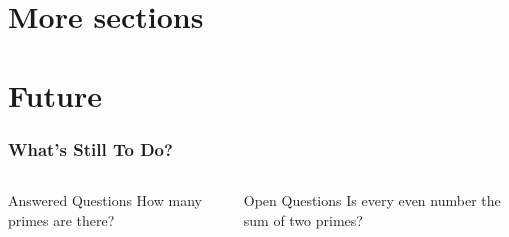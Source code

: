 \section{More sections}
\section{Future}
\begin{frame}
  \frametitle{What’s Still To Do?}
  \begin{columns}
      \begin{block}{Answered Questions}
        How many primes are there?
      \end{block}
      \begin{block}{Open Questions}
        Is every even number the sum of two primes?
      \end{block}
  \end{columns}
\end{frame}


